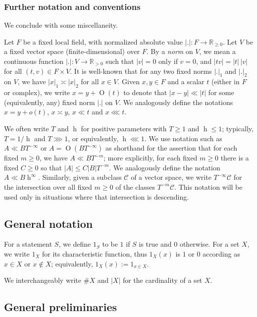 \documentclass[reqno]{amsart}
\DeclareMathOperator{\h}{h}
\def\O{\operatorname{O}}
\theoremstyle{plain} \newtheorem{theorem} {Theorem}
\theoremstyle{definition} \newtheorem{definition} [theorem] {Definition}
\theoremstyle{itplain} %
\numberwithin{equation}{section}
\numberwithin{theorem}{section}
\renewcommand{\geq}{\geqslant}
\renewcommand{\leq}{\leqslant}
\begin{document}
\subsubsection{Further notation and conventions}\label{sec:furth-notat-conv}
We conclude with some miscellaneity.

Let $F$ be a fixed local field, with normalized absolute value $|.| : F \rightarrow \mathbb{R}_{\geq 0}$.  Let $V$ be a fixed vector space (finite-dimensional) over $F$.  By a \emph{norm} on $V$, we mean a continuous function $|.| : V \rightarrow \mathbb{R}_{>0}$ such that $|v| = 0$ only if $v = 0$, and $|t v| = |t|\, |v|$ for all $(t,v) \in F \times  V$.  It is well-known that for any two fixed norms $|.|_1$ and $|.|_2$ on $V$, we have $|x|_1 \asymp |x|_2$ for all $x \in V$.  Given $x,y \in F$ and a scalar $t$ (either in $F$ or complex), we write $x = y + \O(t)$ to denote that $|x-y| \ll |t|$ for some (equivalently, any) fixed norm $|.|$ on $V$.  We analogously define the notations $x = y + o(t)$, $x \asymp y$, $x \ll t$ and $x \lll t$.

We often write $T$ and $\h$ for positive parameters with $T \geq 1$ and $\h \leq 1$; typically, $T = 1/\h$ and $T \ggg 1$, or equivalently, $\h \lll 1$.  We use notation such as $A \ll B T^{-\infty}$ or $A = \O(B T^{-\infty})$ as shorthand for the assertion that for each fixed $m \geq 0$, we have $A \ll B T^{-m}$; more explicitly, for each fixed $m \geq 0$ there is a fixed $C \geq 0$ so that $|A| \leq C |B| T^{-m}$.  We analogously define the notation $A \ll B \h^\infty$.  Similarly, given a subclass $\mathcal{C}$ of a vector space, we write $T^{-\infty} \mathcal{C}$ for the intersection over all fixed $m \geq 0$ of the classes $T^{-m} \mathcal{C}$.  This notation will be used only in situations where that intersection is descending.

\subsection{General notation}
For a statement $S$, we define $1_S$ to be $1$ if $S$ is true and $0$ otherwise.  For a set $X$, we write $1_X$ for its characteristic function, thus $1_X(x)$ is $1$ or $0$ according as $x \in X$ or $x \notin X$; equivalently, $1_X(x) := 1_{x \in X}$.

We interchangeably write $\# X$ and $|X|$ for the cardinality of a set $X$.


\subsection{General preliminaries}\label{sec:gener-prel}
\end{document}
